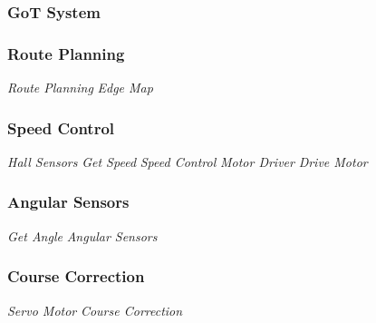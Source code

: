 \subsubsection{GoT System}
\indent
%
%

\subsubsection{Route Planning}
\textit{Route Planning} \textit{Edge Map}

\subsubsection{Speed Control}
\textit{Hall Sensors} \textit{Get Speed} \textit{Speed Control} \textit{Motor Driver} \textit{Drive Motor}

\subsubsection{Angular Sensors}
\textit{Get Angle} \textit{Angular Sensors}

\subsubsection{Course Correction}
\textit{Servo Motor} \textit{Course Correction}

